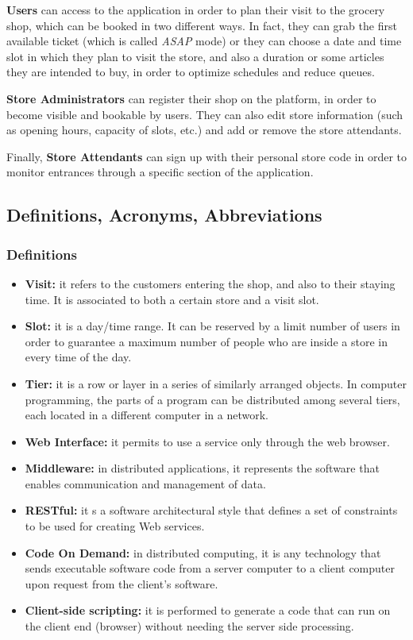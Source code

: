 \documentclass[table, 12pt]{article}
\begin{document}
\textbf{Users} can access to the application in order to plan their visit to the grocery shop, which can be booked in two different ways. In fact, they can grab the first available ticket (which is called \textit{ASAP} mode) or they can choose a date and time slot in which they plan to visit the store, and also a duration or some articles they are intended to buy, in order to optimize schedules and reduce queues.

\textbf{Store Administrators} can register their shop on the platform, in order to become visible and bookable by users. They can also edit store information (such as opening hours, capacity of slots, etc.) and add or remove the store attendants.

Finally, \textbf{Store Attendants} can sign up with their personal store code in order to monitor entrances through a specific section of the application.

\subsection{Definitions, Acronyms, Abbreviations}
\subsubsection{Definitions}
\begin{itemize}
    \item \textbf{Visit:} it refers to the customers entering the shop, and also to their staying time. It is associated to both a certain store and a visit slot.
    \item \textbf{Slot:} it is a day/time range. It can be reserved by a limit number of users in order to guarantee a maximum number of people who are inside a store in every time of the day.
    \item \textbf{Tier:} it is a row or layer in a series of similarly arranged objects. In computer programming, the parts of a program can be distributed among several tiers, each located in a different computer in a network.
    \item \textbf{Web Interface:} it permits to use a service only through the web browser.
    \item \textbf{Middleware:} in distributed applications, it represents the software that enables communication and management of data.
    \item \textbf{RESTful:} it s a software architectural style that defines a set of constraints to be used for creating Web services.
    \item \textbf{Code On Demand:} in distributed computing, it is any technology that sends executable software code from a server computer to a client computer upon request from the client's software.
    \item \textbf{Client-side scripting:} it is performed to generate a code that can run on the client end (browser) without needing the server side processing.
\end{itemize}
\end{document}
